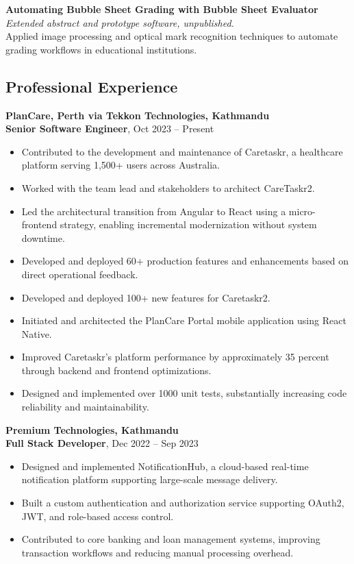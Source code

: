 \textbf{Automating Bubble Sheet Grading with Bubble Sheet Evaluator}\\
\emph{Extended abstract and prototype software, unpublished.}\\
Applied image processing and optical mark recognition techniques to
automate grading workflows in educational institutions.

\hypertarget{professional-experience}{%
\subsection{\texorpdfstring{\textbf{Professional
Experience}}{Professional Experience}}\label{professional-experience}}

\textbf{PlanCare, Perth via Tekkon Technologies, Kathmandu}\\
\textbf{Senior Software Engineer}, Oct 2023 -- Present

\begin{itemize}
\tightlist
\item
  Contributed to the development and maintenance of Caretaskr, a
  healthcare platform serving 1,500+ users across Australia.
\item
  Worked with the team lead and stakeholders to architect CareTaskr2.
\item
  Led the architectural transition from Angular to React using a
  micro-frontend strategy, enabling incremental modernization without
  system downtime.
\item
  Developed and deployed 60+ production features and enhancements based
  on direct operational feedback.
\item
  Developed and deployed 100+ new features for Caretaskr2.
\item
  Initiated and architected the PlanCare Portal mobile application using
  React Native.
\item
  Improved Caretaskr's platform performance by approximately 35 percent
  through backend and frontend optimizations.
\item
  Designed and implemented over 1000 unit tests, substantially
  increasing code reliability and maintainability.
\end{itemize}

\textbf{Premium Technologies, Kathmandu}\\
\textbf{Full Stack Developer}, Dec 2022 -- Sep 2023

\begin{itemize}
\tightlist
\item
  Designed and implemented NotificationHub, a cloud-based real-time
  notification platform supporting large-scale message delivery.
\item
  Built a custom authentication and authorization service supporting
  OAuth2, JWT, and role-based access control.
\item
  Contributed to core banking and loan management systems, improving
  transaction workflows and reducing manual processing overhead.
\end{itemize}


